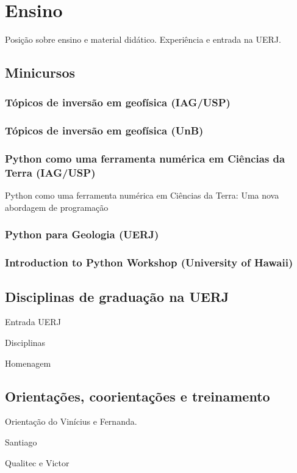 \section{Ensino}

Posição sobre ensino e material didático.
Experiência e entrada na UERJ.

\subsection{Minicursos}

\subsubsection{Tópicos de inversão em geofísica (IAG/USP)}

\subsubsection{Tópicos de inversão em geofísica (UnB)}

\subsubsection{Python como uma ferramenta numérica em Ciências da Terra (IAG/USP)}

Python como uma ferramenta numérica em Ciências da Terra: Uma
nova abordagem de programação

\subsubsection{Python para Geologia (UERJ)}

\subsubsection{Introduction to Python Workshop (University of Hawaii)}


\subsection{Disciplinas de graduação na UERJ}

Entrada UERJ

Disciplinas

Homenagem


\subsection{Orientações, coorientações e treinamento}

Orientação do Vinícius e Fernanda.

Santiago

Qualitec e Victor
